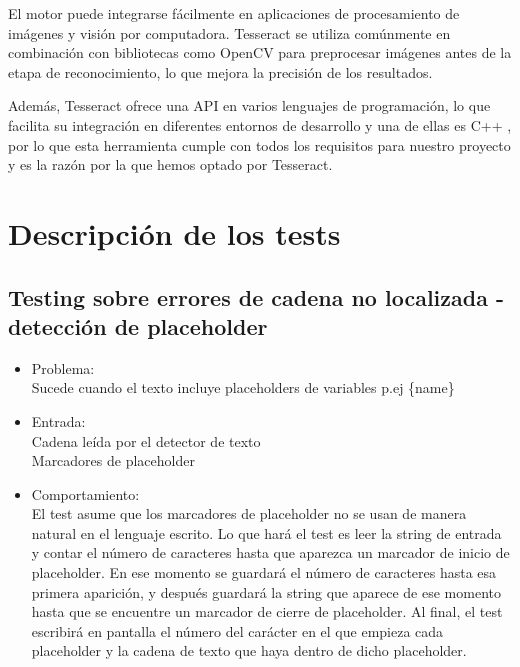 \begin{enumerate}
	El motor puede integrarse fácilmente en aplicaciones de procesamiento de imágenes y visión por computadora. Tesseract se utiliza comúnmente en combinación con bibliotecas como OpenCV para preprocesar imágenes antes de la etapa de reconocimiento, lo que mejora la precisión de los resultados.
	
	Además, Tesseract ofrece una API en varios lenguajes de programación, lo que facilita su integración en diferentes entornos de desarrollo y una de ellas es C++ , por lo que esta herramienta cumple con todos los requisitos para nuestro proyecto y es la razón por la que hemos optado por Tesseract.
\end{enumerate}
\section{Descripción de los tests}
\subsection{Testing sobre errores de cadena no localizada - detección de placeholder}
\begin{itemize}
	\item Problema: \\
	Sucede cuando el texto incluye placeholders de variables p.ej \{name\}  \\
	\item Entrada: \\
	Cadena leída por el detector de texto \\
	Marcadores de placeholder \\
	\item Comportamiento: \\
	El test asume que los marcadores de placeholder no se usan de manera natural en el lenguaje escrito.
	Lo que hará el test es leer la string de entrada y contar el número de caracteres hasta que aparezca un marcador de inicio de placeholder. En ese momento se guardará el número de caracteres hasta esa primera aparición, y después guardará la string que aparece de ese momento hasta que se encuentre un marcador de cierre de placeholder. 
	Al final, el test escribirá en pantalla el número del carácter en el que empieza cada placeholder y la cadena de texto que haya dentro de dicho placeholder.
\end{itemize}

